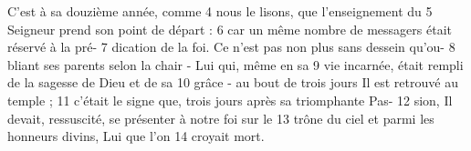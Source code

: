 C'est à sa douzième année, comme	 
4	 	nous le lisons, que l'enseignement du	 
5	 	Seigneur prend son point de départ :	 
6	 	car un même nombre de messagers était réservé à la pré-	 
7	 	dication de la foi. Ce n'est pas non plus sans dessein qu'ou-	 
8	 	bliant ses parents selon la chair - Lui qui, même en sa	 
9	 	vie incarnée, était rempli de la sagesse de Dieu et de sa	 
10	 	grâce - au bout de trois jours Il est retrouvé au temple ;	 
11	 	c'était le signe que, trois jours après sa triomphante Pas-	 
12	 	sion, Il devait, ressuscité, se présenter à notre foi sur le	 
13	 	trône du ciel et parmi les honneurs divins, Lui que l'on	 
14	 	croyait mort.